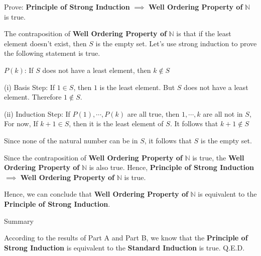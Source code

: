 \begin{flushleft}
Prove: \textbf{Principle of Strong Induction} $\implies$ \textbf{Well Ordering 
Property of} $\mathbb{N}$ is true. \\
\vspace{10px}

The contraposition of \textbf{Well Ordering Property of} $\mathbb{N}$ is that 
if the least element doesn't exist, then $S$ is the empty set. Let's use strong 
induction to prove the following statement is true. \\
\vspace{10px}

$ P(k) $: If $ S $ does not have a least element, then $ k \notin S$ 
\vspace{10px}

(i) Basis Step: If $ 1 \in S $, then $ 1 $ is the least element. But $ S $ does not 
have a least element. Therefore $ 1 \notin S $.
\vspace{10px}

(ii) Induction Step: 
If $P(1), \cdots, P(k)$ are all true, then $1, \cdots, k$ are all not in $S$, 
For now, If $k + 1 \in S$, then it is the least element of $S$. It follows that 
$k + 1 \notin S$ \\
\vspace{10px}

Since none of the natural number can be in $ S $, it follows that $ S $ is the empty set.
\vspace{10px}

Since the contraposition of \textbf{Well Ordering Property of} $\mathbb{N}$ is 
true, the \textbf{Well Ordering Property of} $\mathbb{N}$ is also true. Hence, 
\textbf{Principle of Strong Induction} $\implies$ \textbf{Well Ordering 
Property of} $\mathbb{N}$ is true.
\end{flushleft}

\begin{flushleft}
Hence, we can conclude that \textbf{Well Ordering Property of} $\mathbb{N}$ is 
equivalent to the \textbf{Principle of Strong Induction}. \\
\end{flushleft}

\begin{flushleft}
Summary \\
\vspace{10px}

According to the results of Part A and Part B, we know that the 
\textbf{Principle of Strong Induction} is equivalent to the \textbf{Standard 
Induction} is true. Q.E.D.
\end{flushleft}
